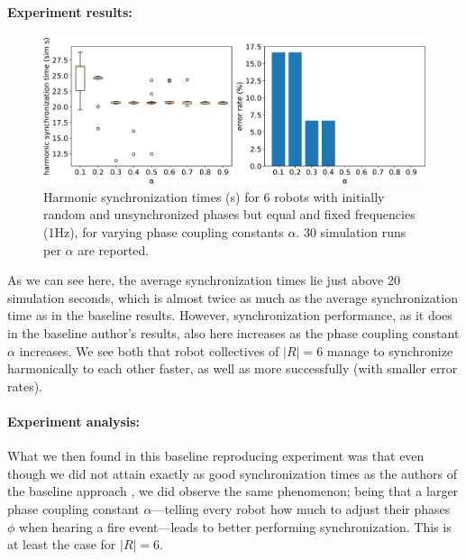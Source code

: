 		\paragraph{Experiment results:\nl}
		
		\begin{figure}[ht!]
			\centering
			\includegraphics[width=\linewidth]{Assets/DocSegments/Chapters/ExperimentsAndResults/Figures/PerfScores/baseline_reproducing_phase_sync_for_alpha.pdf}
			\caption[Experiment results for $\phi$ synchronization baseline reproduction experiment.]{Harmonic synchronization times (s) for 6 robots with initially random and unsynchronized phases but equal and fixed frequencies (1Hz), for varying phase coupling constants $\alpha$. 30 simulation runs per $\alpha$ are reported.}
			\label{fig:baseline_reproducing_phase_sync_for_alpha}
		\end{figure}
		
		As we can see here, the average synchronization times lie just above 20 simulation seconds, which is almost twice as much as the average synchronization time as in the baseline results. However, synchronization performance, as it does in the baseline author's results, also here increases as the phase coupling constant $\alpha$ increases. We see both that robot collectives of $|R|=6$ manage to synchronize harmonically to each other faster, as well as more successfully (with smaller error rates).
		
		\paragraph{Experiment analysis:\nl}
		
		What we then found in this baseline reproducing experiment was that even though we did not attain exactly as good synchronization times as the authors of the baseline approach \cite{nymoen_synch}, we did observe the same phenomenon; being that a larger phase coupling constant $\alpha$—telling every robot how much to adjust their phases $\phi$ when hearing a fire event—leads to better performing synchronization. This is at least the case for $|R|=6$.
		
